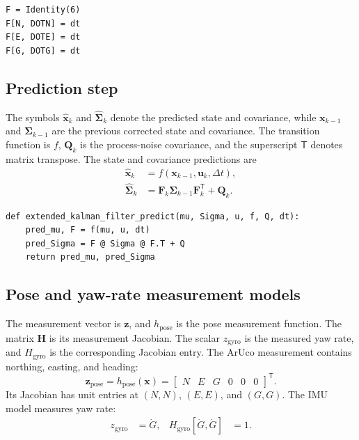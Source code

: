 \documentclass[11pt,a4paper]{article}
\begin{document}
\begin{lstlisting}
F = Identity(6)
F[N, DOTN] = dt
F[E, DOTE] = dt
F[G, DOTG] = dt
\end{lstlisting}

\subsection{Prediction step}

The symbols $\hat{\bm{x}}_k$ and $\hat{\bm{\Sigma}}_k$ denote the predicted
state and covariance, while $\bm{x}_{k-1}$ and $\bm{\Sigma}_{k-1}$ are the
previous corrected state and covariance. The transition function is $f$,
$\bm{Q}_k$ is the process-noise covariance, and the superscript $\mathsf T$
denotes matrix transpose. The state and covariance predictions are
\begin{align}
\hat{\bm{x}}_k &= f(\bm{x}_{k-1},\bm{u}_k,\Delta t),\\
\hat{\bm{\Sigma}}_k
&=\bm{F}_k\bm{\Sigma}_{k-1}\bm{F}_k^{\mathsf T}+\bm{Q}_k.
\end{align}

\begin{lstlisting}
def extended_kalman_filter_predict(mu, Sigma, u, f, Q, dt):
    pred_mu, F = f(mu, u, dt)
    pred_Sigma = F @ Sigma @ F.T + Q
    return pred_mu, pred_Sigma
\end{lstlisting}

\subsection{Pose and yaw-rate measurement models}

The measurement vector is $\bm{z}$, and $h_{\mathrm{pose}}$ is the pose
measurement function. The matrix $\bm{H}$ is its measurement Jacobian. The
scalar $z_{\mathrm{gyro}}$ is the measured yaw rate, and
$H_{\mathrm{gyro}}$ is the corresponding Jacobian entry. The ArUco measurement
contains northing, easting, and heading:
\begin{equation}
\bm{z}_{\mathrm{pose}}=h_{\mathrm{pose}}(\bm{x})
=\begin{bmatrix}N&E&G&0&0&0\end{bmatrix}^{\mathsf T}.
\end{equation}
Its Jacobian has unit entries at $(N,N)$, $(E,E)$, and $(G,G)$. The IMU model measures yaw rate:
\begin{equation}
\begin{aligned}
z_{\mathrm{gyro}} &= \dot G, &
H_{\mathrm{gyro}}[\dot G,\dot G] &= 1.
\end{aligned}
\end{equation}
\end{document}
